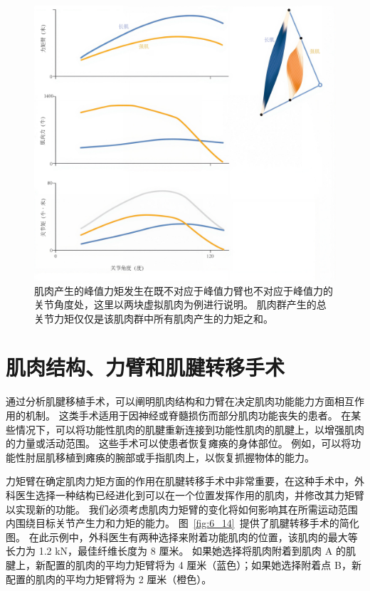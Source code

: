 \begin{figure}[!htb]
	\centering
	\includegraphics[width=1.0\linewidth]{chap6/6_13}
	\caption{肌肉产生的峰值力矩发生在既不对应于峰值力臂也不对应于峰值力的关节角度处，这里以两块虚拟肌肉为例进行说明。
		肌肉群产生的总关节力矩仅仅是该肌肉群中所有肌肉产生的力矩之和。 \label{fig:6_13}}
\end{figure}



\section{肌肉结构、力臂和肌腱转移手术}

通过分析肌腱移植手术，可以阐明肌肉结构和力臂在决定肌肉功能能力方面相互作用的机制。
这类手术适用于因神经或脊髓损伤而部分肌肉功能丧失的患者。
在某些情况下，可以将功能性肌肉的肌腱重新连接到功能性肌肉的肌腱上，以增强肌肉的力量或活动范围。
这些手术可以使患者恢复瘫痪的身体部位。
例如，可以将功能性肘屈肌移植到瘫痪的腕部或手指肌肉上，以恢复抓握物体的能力。


力矩臂在确定肌肉力矩方面的作用在肌腱转移手术中非常重要，在这种手术中，外科医生选择一种结构已经进化到可以在一个位置发挥作用的肌肉，并修改其力矩臂以实现新的功能。
我们必须考虑肌肉力矩臂的变化将如何影响其在所需运动范围内围绕目标关节产生力和力矩的能力。
图~\ref{fig:6_14}~提供了肌腱转移手术的简化图。
在此示例中，外科医生有两种选择来附着功能肌肉的位置，该肌肉的最大等长力为 1.2 kN，最佳纤维长度为 8 厘米。
如果她选择将肌肉附着到肌肉 A 的肌腱上，新配置的肌肉的平均力矩臂将为 4 厘米（蓝色）；如果她选择附着点 B，新配置的肌肉的平均力矩臂将为 2 厘米（橙色）。


